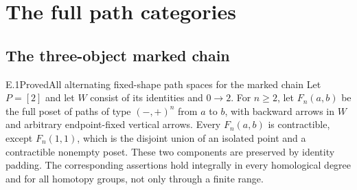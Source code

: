 \section{The full path categories}
\subsection{The three-object marked chain}
\begin{result}{E.1}{Proved}{All alternating fixed-shape path spaces for the marked chain}
Let $P=[2]$ and let $W$ consist of its identities and $0\to2$. For $n\geq2$, let $F_n(a,b)$ be the full poset of paths of type $(-,+)^n$ from $a$ to $b$, with backward arrows in $W$ and arbitrary endpoint-fixed vertical arrows. Every $F_n(a,b)$ is contractible, except $F_n(1,1)$, which is the disjoint union of an isolated point and a contractible nonempty poset. These two components are preserved by identity padding. The corresponding assertions hold integrally in every homological degree and for all homotopy groups, not only through a finite range.
\end{result}
